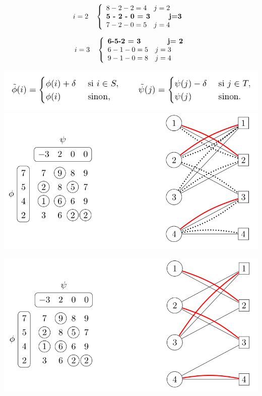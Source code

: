\documentclass{beamer}
\theoremstyle{definition}
\begin{document}
\begin{frame}
	\begin{minipage}{0.45\linewidth}
		$$i= 2 \quad \left\{\begin{array}{l} 8-2-2 = 4 \quad j= 2\\
		\textbf{5 - 2 - 0 = 3 \quad\quad j=3 }\\
		7-2-0 =5 \quad j= 4\end{array}
		\right.$$
	\end{minipage}\hfil
\begin{minipage}{0.45\linewidth}
	$$i= 3 \quad \left\{\begin{array}{l} \textbf{6-5-2 = 3 \quad\quad\quad j= 2}\\
	6 - 1 - 0 = 5 \quad j=3 \\
	9-1-0 =8 \quad j= 4\end{array}
	\right.$$
\end{minipage}
\centering
	\includegraphics[scale=0.35]{z5.png}
	\includegraphics[scale=0.35]{z6.png}
	
\end{frame}

\begin{frame}
	\centering
	\includegraphics[scale=0.4]{z7.png}
	
\end{frame}
\end{document}

